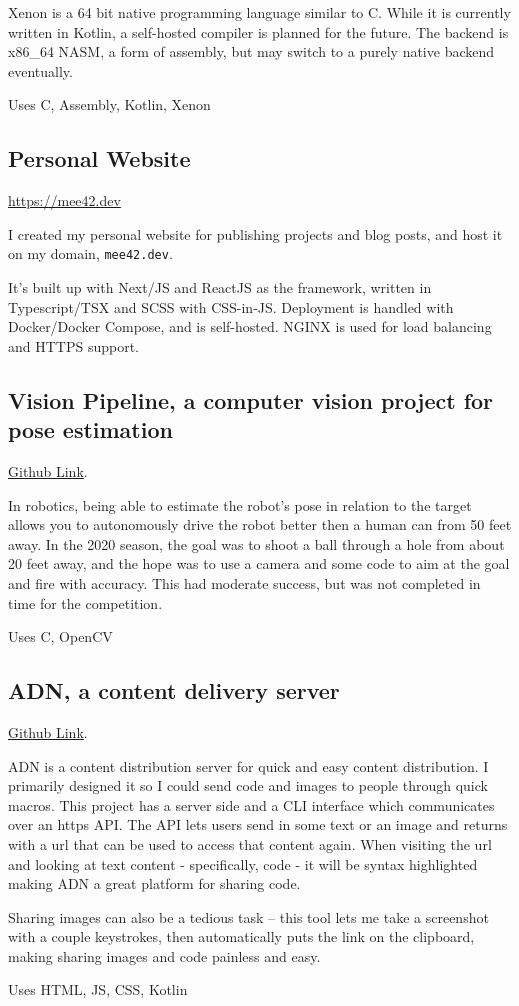 \documentclass[10pt,letterpaper]{article}
\def\link#1#2{\color{blue!60!black}\href{#1}{#2}\color{black}}
\newcommand{\CPP}
{C\nolinebreak[4]\hspace{-.05em}\raisebox{.35ex}{\footnotesize\bf ++}}
\def\code#1{\texttt{#1}}
\begin{document}
    Xenon is a 64 bit native programming language similar to C.
    While it is currently written in Kotlin, a self-hosted compiler is planned for the future.
    The backend is x86\_64 NASM, a form of assembly,
    but may switch to a purely native backend eventually.
    
    \vspace{0.5em}
    \noindent Uses C, Assembly, Kotlin, Xenon

    \subsection*{Personal Website}
    \link{https://mee42.dev}{https://mee42.dev}

    I created my personal website for publishing projects and blog posts, and host it on my domain, \code{mee42.dev}.
    
    \vspace{0.5em}
    \noindent It's built up with Next/JS and ReactJS as the framework, written in Typescript/TSX and SCSS with CSS-in-JS.
    Deployment is handled with Docker/Docker Compose, and is self-hosted. NGINX is used for load balancing and HTTPS support.  
    

    \subsection*{Vision Pipeline, a computer vision project for pose estimation}
    \link{https://github.com/CougarProgramming623/vision-pipeline}{Github Link}.
    
    In robotics, being able to estimate the robot's pose in relation to the target
    allows you to autonomously drive the robot better then a human can from 50 feet away.
    In the 2020 season, the goal was to shoot a ball through a hole from about 20 feet away,
    and the hope was to use a camera and some code to aim at the goal and fire with accuracy.
    This had moderate success, but was not completed in time for the competition.

    \vspace{0.5em}
    \noindent Uses \CPP, OpenCV

    \subsection*{ADN, a content delivery server}
    
    \link{https://github.com/mee42/adn}{Github Link}.
    
    ADN is a content distribution server for quick and easy content distribution.
    I primarily designed it so I could send code and images to people through quick macros.
    This project has a server side and a CLI interface which communicates over an https API.
    The API lets users send in some text or an image
    and returns with a url that can be used to access that content again.
    When visiting the url and looking at text content - specifically, code - it will be syntax highlighted
    making ADN a great platform for sharing code.

    Sharing images can also be a tedious task -- 
    this tool lets me take a screenshot with a couple keystrokes,
    then automatically puts the link on the clipboard,
    making sharing images and code painless and easy.

    \vspace{0.5em}
    \noindent Uses HTML, JS, CSS, Kotlin
\end{document}

